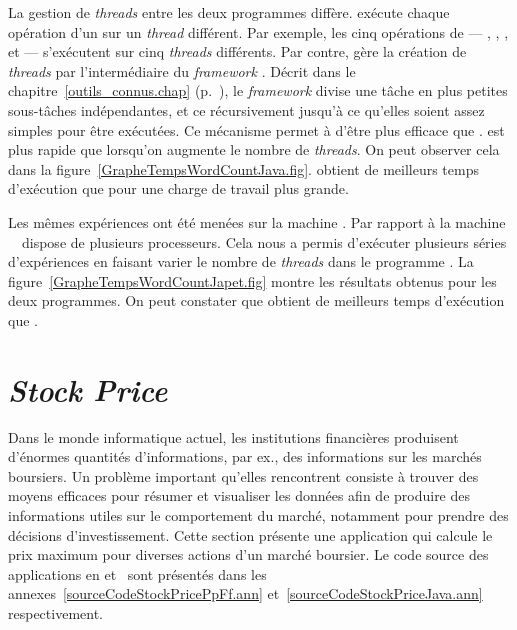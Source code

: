 La gestion de \emph{threads} entre les deux programmes diff\`ere.  ex\'ecute chaque op\'eration d'un  sur un \emph{thread} diff\'erent. Par exemple, les cinq op\'erations de  --- , , ,  et  --- s'ex\'ecutent sur cinq \emph{threads} diff\'erents. Par contre,  g\`ere la cr\'eation de \emph{threads} par l'interm\'ediaire du \emph{framework} . D\'ecrit dans le chapitre~\ref{outils_connus.chap} (p.~\pageref{forkjoin.sect}), le \emph{framework} divise une t\^ache en plus petites sous-t\^aches ind\'ependantes, et ce r\'ecursivement jusqu'\`a ce qu'elles soient assez simples pour \^etre ex\'ecut\'ees. Ce m\'ecanisme permet \`a  d'\^etre plus efficace que .  est plus rapide que  lorsqu'on augmente le nombre de \emph{threads}. On peut observer cela dans la figure~\ref{GrapheTempsWordCountJava.fig}.  obtient de meilleurs temps d'ex\'ecution que  pour une charge de travail plus grande.

Les m\^emes exp\'eriences ont \'et\'e men\'ees sur la machine . Par rapport \`a la machine \, \ dispose de plusieurs processeurs. Cela nous a permis d'ex\'ecuter plusieurs s\'eries d'exp\'eriences en faisant varier le nombre de \emph{threads} dans le programme . La figure~\ref{GrapheTempsWordCountJapet.fig} montre les r\'esultats obtenus pour les deux programmes. On peut constater que  obtient de meilleurs temps d'ex\'ecution  que . 




\section{\emph{Stock Price}}
\label{stockprice.sect}


Dans le monde informatique actuel, les institutions financi\`eres produisent d'\'enormes quantit\'es d'informations, par ex., des informations sur les march\'es boursiers. Un probl\`eme important qu'elles rencontrent consiste \`a trouver des moyens efficaces pour r\'esumer et visualiser les donn\'ees afin de produire des informations utiles sur le comportement du march\'e, notamment pour prendre des d\'ecisions d'investissement. Cette section pr\'esente une application qui calcule le prix maximum pour diverses actions d'un marché boursier. Le code source des applications  en  et~ sont pr\'esent\'es dans les annexes~\ref{sourceCodeStockPricePpFf.ann} et~\ref{sourceCodeStockPriceJava.ann} respectivement. 

